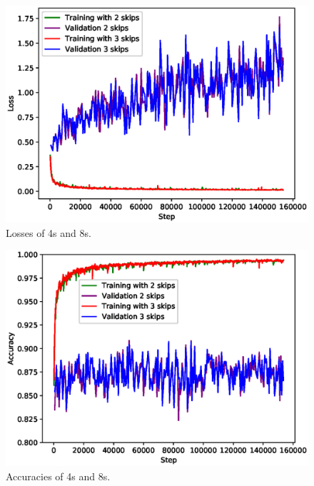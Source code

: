 \documentclass[conference]{IEEEtran}
\begin{document}
\begin{center}
	\begin{figure}
		\begin{center}
			\includegraphics[scale=.75]{image/4losses}
		\end{center}
		\caption{Losses of 4s and 8s.}
		\label{4s_8s_losses}
	\end{figure}
\end{center}

\begin{center}
	\begin{figure}
		\begin{center}
			\includegraphics[scale=.75]{image/4accs}
		\end{center}
		\caption{Accuracies of 4s and 8s.}
		\label{4s_8s_accs}
	\end{figure}
\end{center}
\end{document}
